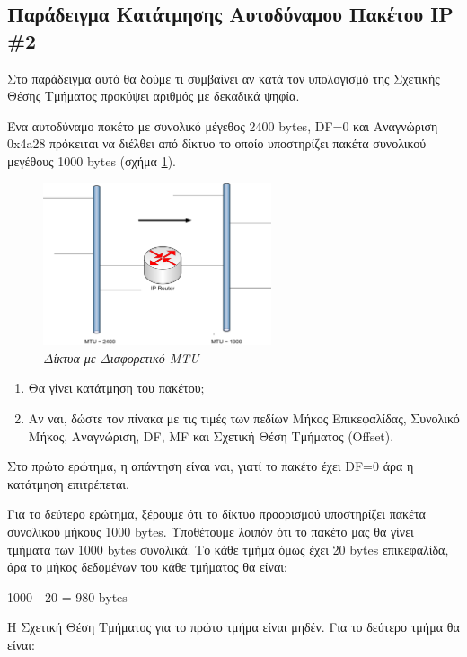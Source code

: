 \subsection*{Παράδειγμα Κατάτμησης Αυτοδύναμου Πακέτου IP \#2}

Στο παράδειγμα αυτό θα δούμε τι συμβαίνει αν κατά τον υπολογισμό της Σχετικής Θέσης Τμήματος προκύψει αριθμός με δεκαδικά ψηφία. 

Ένα αυτοδύναμο πακέτο με συνολικό μέγεθος 2400 bytes, DF=0 και Αναγνώριση 0x4a28 πρόκειται να διέλθει από δίκτυο το οποίο υποστηρίζει πακέτα συνολικού μεγέθους 1000 bytes (σχήμα \ref{3-9}).

\begin{figure}[!ht]
  \centering
  \includegraphics[width=0.60\textwidth]{images/chapter3/3-9}
  \caption {\textsl{Δίκτυα με Διαφορετικό MTU}}
  \label{3-9}
\end{figure} 

\begin{enumerate}
\item Θα γίνει κατάτμηση του πακέτου;
\item Αν ναι, δώστε τον πίνακα με τις τιμές των πεδίων Μήκος Επικεφαλίδας, Συνολικό Μήκος, Αναγνώριση, DF, MF και Σχετική Θέση Τμήματος (Offset).
\end{enumerate}

Στο πρώτο ερώτημα, η απάντηση είναι ναι, γιατί το πακέτο έχει DF=0 άρα η κατάτμηση επιτρέπεται.

Για το δεύτερο ερώτημα, ξέρουμε ότι το δίκτυο προορισμού υποστηρίζει πακέτα συνολικού μήκους 1000 bytes. Υποθέτουμε λοιπόν ότι το πακέτο μας θα γίνει τμήματα των 1000 bytes συνολικά. Το κάθε τμήμα όμως έχει 20 bytes επικεφαλίδα, άρα το μήκος δεδομένων του κάθε τμήματος θα είναι:

\begin{center}
1000 - 20 = 980 bytes
\end{center}

Η Σχετική Θέση Τμήματος για το πρώτο τμήμα είναι μηδέν. Για το δεύτερο τμήμα θα είναι:

